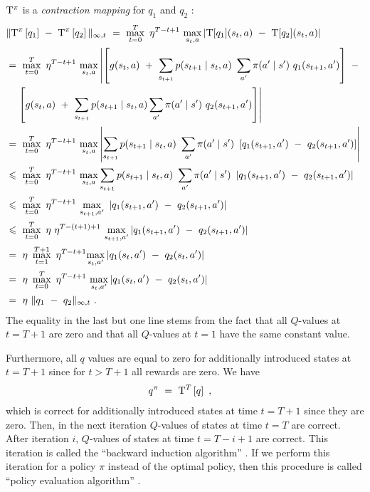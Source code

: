 \documentclass{article}
\renewcommand{\leq}{\leqslant}
\begin{document}
\begin{appendices}
$\mathrm{T}^\pi$ is a {\em contraction mapping} for $q_1$ and $q_2$ \cite{Bertsekas:96}:
\begin{align}
  &\| \rT^\pi \left[ q_1\right]  \ - \  \rT^\pi \left[ q_2\right] \|_{\infty,t} \ = \
  \max_{t=0}^{T} \ \eta^{T-t+1} \ \underset{s_t,a}{\max}
  \left| \rT[q_1](s_t,a) \ - \  \rT[q_2](s_t,a) \right| \\ \nonumber
  &= \ \max_{t=0}^{T} \ \eta^{T-t+1} \ \underset{s_t,a}{\max}
  \left|\left[g(s_t,a) \ + \
  \sum_{s_{t+1}} p(s_{t+1}\mid s_t,a) \ 
  \sum_{a'} \pi(a' \mid s') \ q_1(s_{t+1},a')  \right]
  \ - \ \right. \\\nonumber
  & \ \ \  \left. \left[g(s_t,a) \ + \ \sum_{s_{t+1}} p(s_{t+1}\mid s_t,a)
    \sum_{a'} \pi(a' \mid s') \ q_2(s_{t+1},a')  \right]  
  \right|  \\ \nonumber
  &= \ \max_{t=0}^{T} \ \eta^{T-t+1} \ \underset{s_t,a}{\max}
  \left|
  \sum_{s_{t+1}} p(s_{t+1}\mid s_t,a) \ 
  \sum_{a'} \pi(a' \mid s') \ \left[ q_1(s_{t+1},a')  \ - \  q_2(s_{t+1},a') \right]
  \right|  \\ \nonumber
  &\leq \ \max_{t=0}^{T} \ \eta^{T-t+1} \ \underset{s_t,a}{\max}
  \sum_{s_{t+1}} p(s_{t+1}\mid s_t,a) \ 
  \sum_{a'} \pi(a' \mid s') \ \left| q_1(s_{t+1},a')  \ - \  q_2(s_{t+1},a') \right|
   \\ \nonumber
  &\leq \
  \max_{t=0}^{T} \ \eta^{T-t+1} \  \underset{s_{t+1},a'}{\max}
  \ \left| q_1(s_{t+1},a')  \ - \  q_2(s_{t+1},a') \right|
   \\ \nonumber
  &\leq \
  \max_{t=0}^{T} \ \eta \  \eta^{T-(t+1)+1} \ \underset{s_{t+1},a'}{\max}
  \left|q_1(s_{t+1},a')  \ - \ q_2(s_{t+1},a') \right|\\ \nonumber
  &= \  \eta \ \max_{t=1}^{T+1} \  \eta^{T-t+1} \underset{s_{t},a'}{\max}
  \left|q_1(s_{t},a')  \ - \ q_2(s_{t},a') \right|\\ \nonumber
  &= \  \eta \ \max_{t=0}^{T} \  \eta^{T-t+1} \ \underset{s_{t},a'}{\max}
  \left|q_1(s_{t},a')  \ - \ q_2(s_{t},a') \right|\\ \nonumber
  &= \  \eta \  \| q_1 \ - \ q_2 \|_{\infty,t} \ .
\end{align} 
The equality in the last but one line stems from the fact that
all $Q$-values at $t=T+1$ are zero and that all $Q$-values at $t=1$ have
the same constant value. 


Furthermore, all $q$ values are equal to
zero for additionally introduced
states at $t=T+1$ since for $t>T+1$ all rewards are zero.
We have
\begin{align}
q^\pi \ &= \ \mathrm{T}^T\left[ q \right] \ ,
\end{align} 
which is correct for additionally introduced states at time $t=T+1$ since they are zero.
Then, in the next iteration $Q$-values of states at time $t=T$ are correct.
After iteration $i$, $Q$-values of states at time $t=T-i+1$ are correct.
This iteration is called the ``backward induction algorithm'' \cite{Puterman:90,Puterman:05}.
If we perform this iteration for a policy $\pi$ instead of
the optimal policy, then this procedure is called ``policy evaluation
algorithm'' \cite{Puterman:90,Puterman:05}.






\end{appendices}
\end{document}
